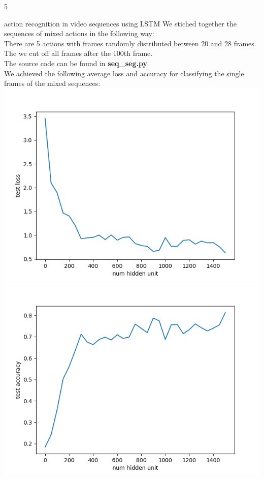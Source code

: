 \documentclass{article}
\begin{document}
\begin{ukon-infie}[18.2.18]{5}
\begin{exercise}[p=50+10]{action recognition in video sequences using LSTM}
{		}
		\question{}
		{
		We stiched together the sequences of mixed actions in the following way:\\
		There are 5 actions with frames randomly distributed between 20 and 28 frames. The we cut off all frames after the 100th frame.\\
		The source code can be found in \textbf{seq\_seg.py}\\
		We achieved the following average loss and accuracy for classifying the single frames of the mixed sequences:\\
		\includegraphics[scale=0.4]{seg_loss.png}
		\includegraphics[scale=0.4]{seg_accuracy.png}
		}
		\end{exercise}
		
\end{ukon-infie}
\end{document}

